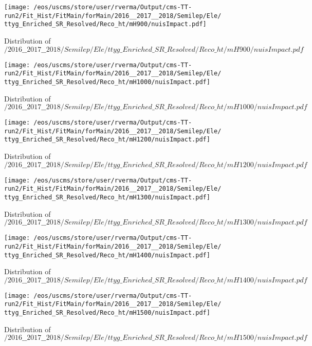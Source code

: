 \begin{figure}
\centering
\texttt{[image: /eos/uscms/store/user/rverma/Output/cms-TT-run2/Fit\_Hist/FitMain/forMain/2016\_\_2017\_\_2018/Semilep/Ele/ttyg\_Enriched\_SR\_Resolved/Reco\_ht/mH900/nuisImpact.pdf]}
\caption{Distribution of $/2016\_\_2017\_\_2018/Semilep/Ele/ttyg\_Enriched\_SR\_Resolved/Reco\_ht/mH900/nuisImpact.pdf$}
\end{figure}

\begin{figure}
\centering
\texttt{[image: /eos/uscms/store/user/rverma/Output/cms-TT-run2/Fit\_Hist/FitMain/forMain/2016\_\_2017\_\_2018/Semilep/Ele/ttyg\_Enriched\_SR\_Resolved/Reco\_ht/mH1000/nuisImpact.pdf]}
\caption{Distribution of $/2016\_\_2017\_\_2018/Semilep/Ele/ttyg\_Enriched\_SR\_Resolved/Reco\_ht/mH1000/nuisImpact.pdf$}
\end{figure}

\begin{figure}
\centering
\texttt{[image: /eos/uscms/store/user/rverma/Output/cms-TT-run2/Fit\_Hist/FitMain/forMain/2016\_\_2017\_\_2018/Semilep/Ele/ttyg\_Enriched\_SR\_Resolved/Reco\_ht/mH1200/nuisImpact.pdf]}
\caption{Distribution of $/2016\_\_2017\_\_2018/Semilep/Ele/ttyg\_Enriched\_SR\_Resolved/Reco\_ht/mH1200/nuisImpact.pdf$}
\end{figure}

\begin{figure}
\centering
\texttt{[image: /eos/uscms/store/user/rverma/Output/cms-TT-run2/Fit\_Hist/FitMain/forMain/2016\_\_2017\_\_2018/Semilep/Ele/ttyg\_Enriched\_SR\_Resolved/Reco\_ht/mH1300/nuisImpact.pdf]}
\caption{Distribution of $/2016\_\_2017\_\_2018/Semilep/Ele/ttyg\_Enriched\_SR\_Resolved/Reco\_ht/mH1300/nuisImpact.pdf$}
\end{figure}

\begin{figure}
\centering
\texttt{[image: /eos/uscms/store/user/rverma/Output/cms-TT-run2/Fit\_Hist/FitMain/forMain/2016\_\_2017\_\_2018/Semilep/Ele/ttyg\_Enriched\_SR\_Resolved/Reco\_ht/mH1400/nuisImpact.pdf]}
\caption{Distribution of $/2016\_\_2017\_\_2018/Semilep/Ele/ttyg\_Enriched\_SR\_Resolved/Reco\_ht/mH1400/nuisImpact.pdf$}
\end{figure}

\begin{figure}
\centering
\texttt{[image: /eos/uscms/store/user/rverma/Output/cms-TT-run2/Fit\_Hist/FitMain/forMain/2016\_\_2017\_\_2018/Semilep/Ele/ttyg\_Enriched\_SR\_Resolved/Reco\_ht/mH1500/nuisImpact.pdf]}
\caption{Distribution of $/2016\_\_2017\_\_2018/Semilep/Ele/ttyg\_Enriched\_SR\_Resolved/Reco\_ht/mH1500/nuisImpact.pdf$}
\end{figure}


